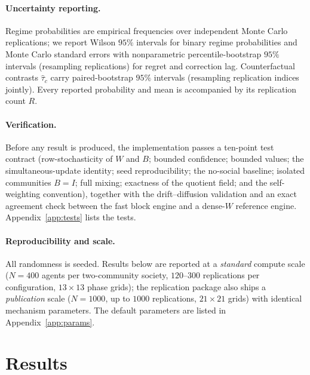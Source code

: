 \documentclass[11pt]{article}
\newcommand{\1}{\mathbf{1}}
\begin{document}
\paragraph{Uncertainty reporting.} Regime probabilities are empirical
frequencies over independent Monte Carlo replications; we report Wilson $95\%$
intervals for binary regime probabilities and Monte Carlo standard errors with
nonparametric percentile-bootstrap $95\%$ intervals (resampling replications) for
regret and correction lag. Counterfactual contrasts $\widehat\tau_c$ carry
paired-bootstrap $95\%$ intervals (resampling replication indices jointly). Every
reported probability and mean is accompanied by its replication count $R$.

\paragraph{Verification.}
Before any result is produced, the implementation passes a ten-point test
contract (row-stochasticity of $W$ and $B$; bounded confidence; bounded values;
the simultaneous-update identity; seed reproducibility; the no-social baseline;
isolated communities $B=I$; full mixing; exactness of the quotient field; and
the self-weighting convention), together with the drift--diffusion validation
and an exact agreement check between the fast block engine and a dense-$W$
reference engine. Appendix~\ref{app:tests} lists the tests.

\paragraph{Reproducibility and scale.}
All randomness is seeded. Results below are reported at a \emph{standard}
compute scale ($N=400$ agents per two-community society, $120$--$300$
replications per configuration, $13\times13$ phase grids); the replication
package also ships a \emph{publication} scale ($N=1000$, up to $1000$
replications, $21\times21$ grids) with identical mechanism parameters. The
default parameters are listed in Appendix~\ref{app:params}.

\section{Results}
\label{sec:results}
\end{document}
